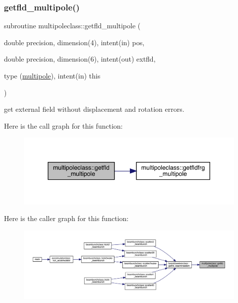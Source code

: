 \mbox{\label{namespacemultipoleclass_af4fb9d3cfd9db2d92930fcda605fbe26}} 
\subsubsection{\texorpdfstring{getfld\_multipole()}{getfld\_multipole()}}
{\footnotesize\ttfamily subroutine multipoleclass\+::getfld\+\_\+multipole (\begin{DoxyParamCaption}\item[{double precision, dimension(4), intent(in)}]{pos,  }\item[{double precision, dimension(6), intent(out)}]{extfld,  }\item[{type (\mbox{\hyperlink{namespacemultipoleclass_structmultipoleclass_1_1multipole}{multipole}}), intent(in)}]{this }\end{DoxyParamCaption})}



get external field without displacement and rotation errors. 

Here is the call graph for this function\+:\nopagebreak
\begin{figure}[H]
\begin{center}
\leavevmode
\includegraphics[width=345pt]{namespacemultipoleclass_af4fb9d3cfd9db2d92930fcda605fbe26_cgraph}
\end{center}
\end{figure}
Here is the caller graph for this function\+:\nopagebreak
\begin{figure}[H]
\begin{center}
\leavevmode
\includegraphics[width=350pt]{namespacemultipoleclass_af4fb9d3cfd9db2d92930fcda605fbe26_icgraph}
\end{center}
\end{figure}
\mbox{\label{namespacemultipoleclass_ade719df1a7d0e47f6495032cb64b1450}} 
